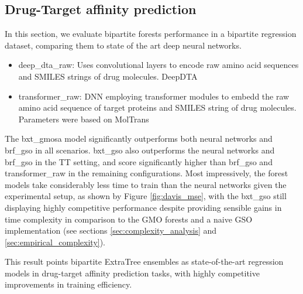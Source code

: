 \documentclass[conference]{IEEEtran}
\begin{document}



\subsection{Drug-Target affinity prediction}

In this section, we evaluate bipartite forests performance in a bipartite regression dataset, comparing them to state of the art deep neural networks.

\begin{itemize}
    \item deep\_dta\_raw: Uses convolutional layers to encode raw amino acid sequences and SMILES strings of drug molecules. DeepDTA \cite{Ozturk_2018}
    \item transformer\_raw: DNN employing transformer modules to embedd the raw amino acid sequence of target proteins and SMILES string of drug molecules. Parameters were based on MolTrans \cite{}
\end{itemize}

The bxt\_gmosa model \cite{Pliakos_2020} significantly outperforms both neural networks and brf\_gso in all scenarios. bxt\_gso also outperforms the neural networks and brf\_gso in the TT setting, and score significantly higher than brf\_gso and transformer\_raw in the remaining configurations. Most impressively, the forest models take considerably less time to train than the neural networks given the experimental setup, as shown by Figure \ref{fig:davis_mse}, with the bxt\_gso still displaying highly competitive performance despite providing sensible gains in time complexity in comparison to the GMO forests and a naive GSO implementation (see sections \ref{sec:complexity_analysis} and \ref{sec:empirical_complexity}).

This result points bipartite ExtraTree ensembles as state-of-the-art regression models in drug-target affinity prediction tasks, with highly competitive improvements in training efficiency.

\end{document}
